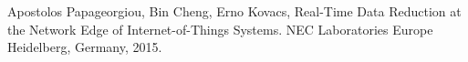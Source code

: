 \documentclass[11pt,journal, a4paper]{IEEEtran}
\begin{document}
\begin{thebibliography}{5}


 Apostolos Papageorgiou, Bin Cheng, Erno Kovacs, Real-Time Data Reduction at the Network Edge of Internet-of-Things Systems. NEC Laboratories Europe Heidelberg, Germany, 2015.







\end{thebibliography}
\end{document}
